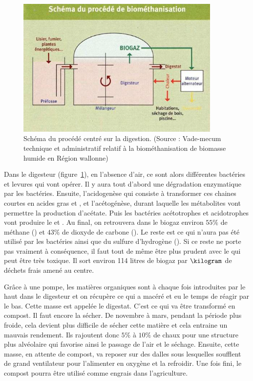 \begin{figure}
\centering
\includegraphics[width=0.9\textwidth]{img/biometh2}
\caption{Schéma du procédé centré sur la digestion. (Source : Vade-mecum technique et administratif relatif à la biométhanisation de biomasse humide en Région wallonne)}
\label{fig:biometh2}
\end{figure}

Dans le digesteur (figure~\ref{fig:biometh2}), en l'absence d'air, ce sont alors différentes bactéries et levures qui vont opérer. Il y aura tout d'abord une dégradation enzymatique par les bactéries. Ensuite, l'acidogenèse qui consiste à transformer ces chaines courtes en acides gras et , et l'acétogénèse, durant laquelle les métabolites vont permettre la production d'acétate. Puis les bactéries acétotrophes et acidotrophes vont produire le  et . Au final, on retrouvera dans le biogaz environ $55\%$ de méthane () et $43\%$ de dioxyde de carbone (). Le reste est ce qui n'aura pas été utilisé par les bactéries ainsi que du sulfure d'hydrogène (). Si ce reste ne porte pas vraiment à conséquence, il faut tout de même être plus prudent avec le  qui peut être très toxique. Il sort environ 114 litres de biogaz par $\kilogram$ de déchets frais amené au centre.

Grâce à une pompe, les matières organiques sont à chaque fois introduites par le haut dans le digesteur et on récupère ce qui a macéré et eu le temps de réagir par le bas. Cette masse est appelée le digestat. C'est ce qui va être transformé en compost. Il faut encore la sécher. De novembre à mars, pendant la période plus froide, cela devient plus difficile de sécher cette matière et cela entraine un mauvais rendement. Ils rajoutent donc $5\%$ à $10\%$ de chaux pour une structure plus alvéolaire qui favorise ainsi le passage de l'air et le séchage. Ensuite, cette masse, en attente de compost, va reposer sur des dalles sous lesquelles soufflent de grand ventilateur pour l'alimenter en oxygène et la refroidir. Une fois fini, le compost pourra être utilisé comme engrais dans l'agriculture.

